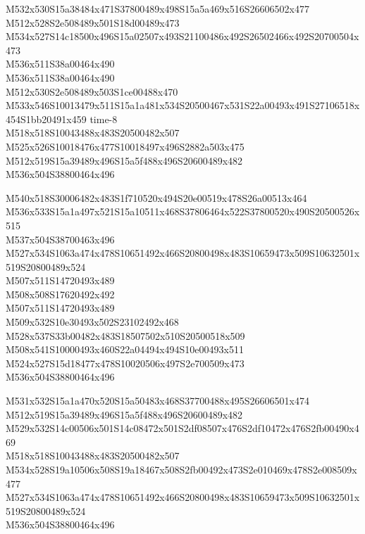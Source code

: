 \documentclass{article}
\begin{document}
\begin{multicols}{5}
\begin{center}

M532x530S15a38484x471S37800489x498S15a5a469x516S26606502x477 %
\\M512x528S2e508489x501S18d00489x473 %
\\M534x527S14c18500x496S15a02507x493S21100486x492S26502466x492S20700504x473 %
\\M536x511S38a00464x490 %
\\M536x511S38a00464x490 %
\\M512x530S2e508489x503S1ce00488x470 %
\\M533x546S10013479x511S15a1a481x534S20500467x531S22a00493x491S27106518x454S1bb20491x459 time-8
\\M518x518S10043488x483S20500482x507 %
\\M525x526S10018476x477S10018497x496S2882a503x475 %
\\M512x519S15a39489x496S15a5f488x496S20600489x482 %
\\M536x504S38800464x496 %

M540x518S30006482x483S1f710520x494S20e00519x478S26a00513x464 %
\\M536x533S15a1a497x521S15a10511x468S37806464x522S37800520x490S20500526x515 %
\\M537x504S38700463x496 %
\\M527x534S1063a474x478S10651492x466S20800498x483S10659473x509S10632501x519S20800489x524 %
\\M507x511S14720493x489 %
\\M508x508S17620492x492 %
\\M507x511S14720493x489 %
\\M509x532S10e30493x502S23102492x468 %
\\M528x537S33b00482x483S18507502x510S20500518x509 %
\\M508x541S10000493x460S22a04494x494S10e00493x511 %
\\M524x527S15d18477x478S10020506x497S2e700509x473 %
\\M536x504S38800464x496 %

M531x532S15a1a470x520S15a50483x468S37700488x495S26606501x474 %
\\M512x519S15a39489x496S15a5f488x496S20600489x482 %
\\M529x532S14c00506x501S14c08472x501S2df08507x476S2df10472x476S2fb00490x469 %
\\M518x518S10043488x483S20500482x507 %
\\M534x528S19a10506x508S19a18467x508S2fb00492x473S2e010469x478S2e008509x477 %
\\M527x534S1063a474x478S10651492x466S20800498x483S10659473x509S10632501x519S20800489x524 %
\\M536x504S38800464x496 %


\end{center}
\end{multicols}
\end{document}

